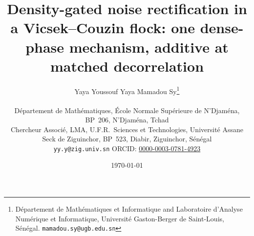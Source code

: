 \documentclass[11pt,a4paper]{article}
\begin{document}
\title{Density-gated noise rectification in a Vicsek--Couzin flock: one dense-phase mechanism, additive at matched decorrelation}

\author{Yaya Youssouf Yaya \quad Mamadou Sy\thanks{D\'epartement de
        Math\'ematiques et Informatique and Laboratoire d'Analyse
        Num\'erique et Informatique, Universit\'e Gaston-Berger de
        Saint-Louis, S\'en\'egal. \texttt{mamadou.sy@ugb.edu.sn}} \\[0.5em]
        \begin{minipage}{0.88\textwidth}\centering\small
        D\'epartement de Math\'ematiques, \'Ecole Normale Sup\'erieure de
        N'Djam\'ena, BP~206, N'Djam\'ena, Tchad \\
        Chercheur Associ\'e, LMA, U.F.R.~Sciences et Technologies,
        Universit\'e Assane Seck de Ziguinchor, BP~523, Diabir,
        Ziguinchor, S\'en\'egal \\
        \texttt{yy.y@zig.univ.sn} \;\;
        ORCID: \href{https://orcid.org/0000-0003-0781-4923}{0000-0003-0781-4923}
        \end{minipage}}

\date{\today}

\maketitle
\end{document}
